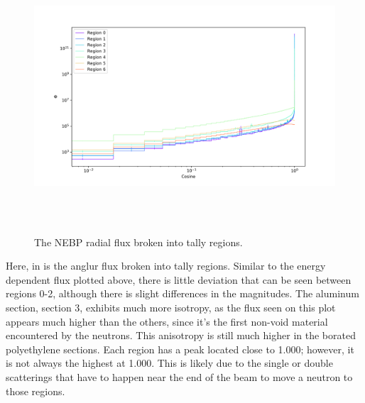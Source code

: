 \clearpage

\begin{figure}[htb]
\centering
\includegraphics[height=4in]{tex/figures/flux_rad_cos.png}
\caption[Regional Flux vs. Angle]{The NEBP radial flux broken into tally regions.}
\label{fig:flux_rad_cos}
\end{figure}

Here, in  is the anglur flux broken into tally regions.
Similar to the energy dependent flux plotted above, there is little deviation that can be seen between regions 0-2, although there is slight differences in the magnitudes.
The aluminum section, section 3, exhibits much more isotropy, as the flux seen on this plot appears much higher than the others, since it's the first non-void material encountered by the neutrons.
This anisotropy is still much higher in the borated polyethylene sections.
Each region has a peak located close to 1.000; however, it is not always the highest at 1.000.
This is likely due to the single or double scatterings that have to happen near the end of the beam to move a neutron to those regions.

\clearpage

